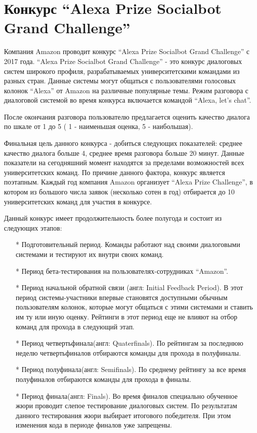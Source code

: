\section{Конкурс “Alexa Prize Socialbot Grand Challenge”}

Компания Amazon проводит конкурс “Alexa Prize Socialbot Grand Challenge” с 2017 года. “Alexa Prize Socialbot Grand Challenge” - это конкурс диалоговых систем широкого профиля, разрабатываемых университетскими командами из разных стран. Данные системы могут общаться с пользователями голосовых колонок “Alexa” от Amazon на различные популярные темы. Режим разговора с диалоговой системой во время конкурса включается командой “Alexa, let’s chat”.

После окончания разговора пользователю предлагается оценить качество диалога по шкале от 1 до 5 ( 1 - наименьшая оценка, 5 - наибольшая). 

Финальная цель данного конкурса - добиться следующих показателей: среднее качество диалога больше 4, среднее время разговора больше 20 минут. Данные показатели на сегодняшний момент находятся за пределами возможностей всех университетских команд. По причине данного фактора, конкурс является поэтапным. Каждый год компания Amazon организует “Alexa Prize Challenge”, в котором из большого числа заявок (несколько сотен в год) отбирается до 10 университетских команд для участия в конкурсе.

Данный конкурс имеет продолжительность более полугода и состоит из следующих этапов:
\begin{itemize}
\item[*] Подготовительный период. Команды работают над своими диалоговыми системами и тестируют их внутри своих команд.
\item[*] Период бета-тестирования на пользователях-сотрудниках “Amazon”. 
\item[*] Период начальной обратной связи (англ: Initial Feedback Period). В этот период системы-участники впервые становятся доступными обычным пользователям колонок, которые могут общаться с этими системами и ставить им ту или иную оценку. Рейтинги в этот период еще не влияют на отбор команд для прохода в следующий этап.
\item[*] Период четвертьфинала(англ: Quaterfinals). По рейтингам за последнюю неделю четвертьфиналов отбираются команды для прохода в полуфиналы.
\item[*] Период полуфинала(англ: Semifinals). По среднему рейтингу за все время полуфиналов отбираются команды для прохода в финалы.
\item[*] Период финала(англ: Finals). Во время финалов специально обученное жюри проводит слепое тестирование диалоговых систем. По результатам данного тестирования жюри выбирает итогового победителя. При этом изменения кода в периоде финалов уже запрещены.
\end{itemize}

